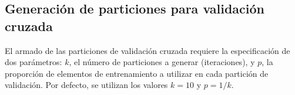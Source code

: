 %
%
\subsection{Generación de particiones para validación cruzada}
%
El armado de las particiones de validación cruzada requiere la
especificación de dos parámetros: $k$, el número de particiones a
generar (iteraciones), y $p$, la proporción de elementos de
entrenamiento a utilizar en cada partición de validación. Por defecto,
se utilizan los valores $k=10$ y $p=1/k$.

